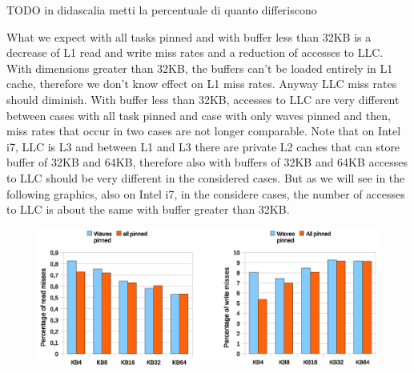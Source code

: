 \begin{table}[tbp]
\centering%
\hspace{4em}
\label{tab:assignment}
\caption{CPUs assignment}
\end{table}
TODO in didascalia metti la percentuale di quanto differiscono

What we expect with all tasks pinned and with buffer less than 32KB is a decrease of L1 read and write miss rates and a reduction of accesses to LLC. 
With dimensions greater than 32KB, the buffers can't be loaded entirely in L1 cache, therefore we don't know effect on L1 miss rates. Anyway LLC miss 
rates should diminish. With buffer less than 32KB, accesses to LLC are very different between cases with all task pinned and case with only waves 
pinned and then, miss rates that occur in two cases are not longer comparable. Note that on Intel i7, LLC is L3 and between L1 and L3 there are private L2 
caches that can store buffer of 32KB and 64KB, therefore also with buffers of 32KB and 64KB accesses to LLC should be very different in the considered cases.
But as we will see in the following graphics, also on Intel i7, in the considere cases, the number of accesses to LLC is about the same with buffer greater 
than 32KB. 

\begin{figure}[htbp]
\centering
\includegraphics[width=\widefigure]{images/cpuaff/cpuaff_l1_load_store_Xeon.eps}
\caption{}
\label{fig:cpuaff_l1_load_store_xeon}
\end{figure}

